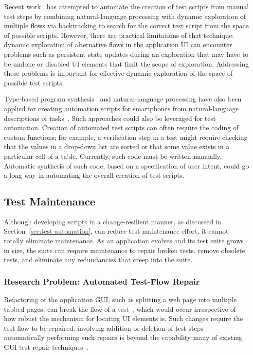 Recent work~\cite{thummalapenta:2012a} has attempted to automate the creation of
test scripts from manual test steps by combining natural-language processing
with dynamic exploration of multiple flows via backtracking to search for the
correct test script from the space of possible scripts. However, there are
practical limitations of that technique: dynamic exploration of alternative
flows in the application UI can encounter problems such as persistent state
updates during an exploration that may have to be undone or disabled UI elements
that limit the scope of exploration. Addressing these problems is important for
effective dynamic exploration of the space of possible test scripts.

Type-based program synthesis~\cite{Perelman:2012} and natural-language
processing have also been applied for creating automation scripts for
smartphones from natural-language descriptions of tasks~\cite{Le:2013}. Such
approaches could also be leveraged for test automation. Creation of automated
test scripts can often require the coding of custom functions; for example, a
verification step in a test might require checking that the values in a
drop-down list are sorted or that some value exists in a particular cell of a
table. Currently, such code must be written manually. Automatic synthesis of
such code, based on a specification of user intent, could go a long way in
automating the overall creation of test scripts.

\subsection{Test Maintenance}
\label{sec:test-maintenance}

Although developing scripts in a change-resilient manner, as discussed in
Section~\ref{sec:test-automation}, can reduce test-maintenance effort, it cannot
totally eliminate maintenance. As an application evolves and its test suite
grows in size, the suite can require maintenance to repair broken tests, remove
obsolete tests, and eliminate any redundancies that creep into the suite.

\subsubsection*{Research Problem: Automated Test-Flow Repair}

Refactoring of the application GUI, such as splitting a web page into multiple
tabbed pages, can break the flow of a test~\cite{thummalapenta:2013a}, which
would occur irrespective of how robust the mechanism for locating UI elements
is. Such changes require the test flow to be repaired, involving addition or
deletion of test steps---automatically performing such repairs is beyond the
capability many of existing GUI test repair techniques~\cite{Choudhary:2011,
  Grechanik:2009, Memon:2008}.

